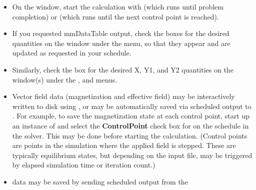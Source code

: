 \begin{list}{}{\setlength{\labelwidth}{0pt}
               \setlength{\leftmargin}{0pt}
               \setlength{\rightmargin}{\leftmargin}
               \setlength{\itemsep}{0pt}}
\begin{description}
\begin{itemize}
\begin{itemize}
\begin{enumerate}
        \end{enumerate}
      \end{itemize}
    \end{itemize}
    \item[Start calculation:]\blankspace
    \begin{itemize}
      \item On the  window, start the calculation with
             (which runs until problem completion) or
             (which runs until the next control point is
            reached).
      \item If you requested mmDataTable output, check the boxes for the
            desired quantities on the
             window under
            the  menu, so that they appear and are updated as
            requested in your schedule.
      \item Similarly, check the box for the desired X, Y1, and Y2
            quantities on the 
            window(s) under the ,  and  menus.
    \end{itemize}
    \item[Save results:]\blankspace
    \begin{itemize}
      \item Vector field data (magnetization and effective field) may be
            interactively written to disk using
            , or may be
            automatically saved via scheduled output to
            .  For example, to
            save the magnetization state at each control point, start up
            an instance of  and select the {\bf
            ControlPoint} check box for
             on the  schedule in the
            solver.  This may be done before starting the calculation.
            (Control points are points in the simulation where the applied
            field is stepped.  These are typically
            equilibrium states, but
            depending on the input  file, may be triggered by
            elapsed simulation time or iteration count.)
      \item {} data may be saved by
            sending scheduled output from the

\end{itemize}
\end{description}
\end{list}
